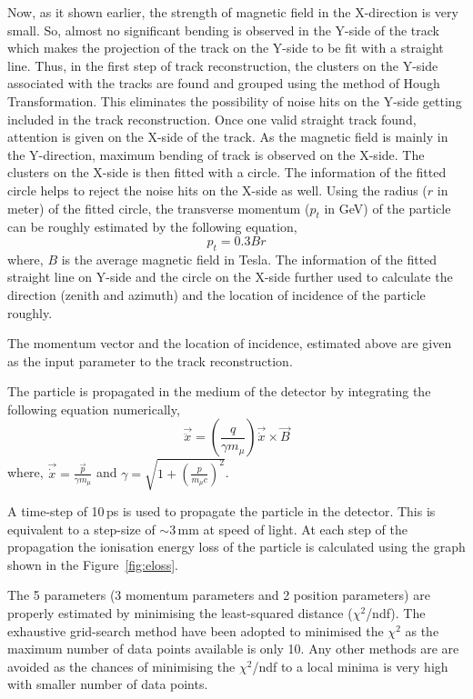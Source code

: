 Now, as it shown earlier, the strength of magnetic field in the
X-direction is very small. So, almost no significant bending is
observed in the Y-side of the track which makes the projection of
the track on the Y-side to be fit with a straight line.
Thus, in the first step of track reconstruction, the clusters on
the Y-side associated with the tracks are found and grouped using
the method of Hough Transformation\cite{hought}. This eliminates
the possibility of noise hits on the Y-side getting included in the
track reconstruction. Once one valid straight track found, attention
is given on the X-side of the track. As the magnetic field is mainly
in the Y-direction, maximum bending of track is observed on the X-side.
The clusters on the X-side is then fitted with a circle.
The information of the fitted circle helps to reject the noise hits
on the X-side as well.
Using the radius ($r$ in meter) of the fitted circle, the transverse
momentum ($p_t$ in GeV) of the particle can be roughly estimated by
the following equation,
\begin{equation}
  p_{t}=0.3Br \label{eq:pt_est}
\end{equation}
where, $B$ is the average magnetic field in Tesla.
The information of the fitted straight line on Y-side and the circle
on the X-side further used to calculate the direction (zenith and
azimuth) and the location of incidence of the particle roughly.

The momentum vector and the location of incidence, estimated
above are given as the input parameter to the track reconstruction.

The particle is propagated in the medium of the detector by integrating
the following equation numerically,
\begin{equation}
  \vec{\ddot{x}} = \left(\frac{q}{\gamma m_{\mu}}\right)\vec{\dot{x}}\times \vec{B}
\end{equation}
where, $\vec{\dot{x}}=\frac{\vec{p}}{\gamma m_{\mu}}$ and
$\gamma=\sqrt{1+\left(\frac{p}{m_{\mu}c}\right)^{2}}$.

A time-step of 10\,ps is used to propagate the particle in the
detector. This is equivalent to a step-size of $\sim$3\,mm at speed
of light. At each step of the propagation the ionisation energy
loss of the particle is calculated using the graph shown in
the Figure~\ref{fig:eloss}.

The 5 parameters (3 momentum parameters and 2 position parameters) are
properly estimated by minimising the least-squared distance
($\chi^{2}$/ndf).
The exhaustive grid-search method have been adopted to minimised the
$\chi^{2}$ as the maximum number of data points available is only 10.
Any other methods are are avoided as the chances of minimising the
$\chi^{2}$/ndf to a local minima is very high with smaller number of
data points.

